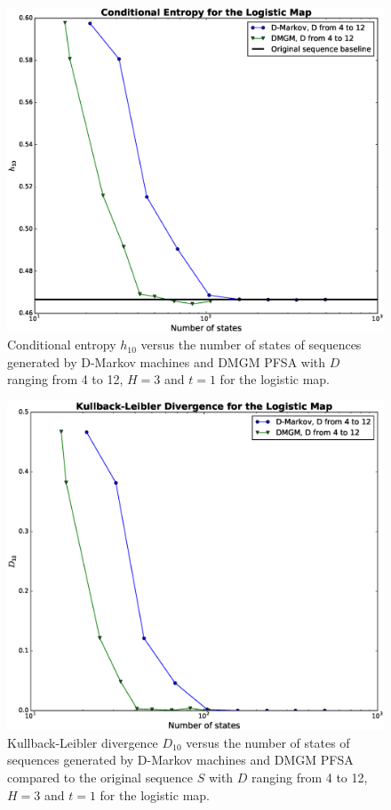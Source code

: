 {\begin{figure}[h]
\centering
\includegraphics[scale=0.35]{Figuras/logisticmap_h_mk4.eps}
\caption{Conditional entropy $h_{10}$ versus the number of states of sequences generated by D-Markov machines and DMGM PFSA with $D$ ranging from 4 to 12, $H=3$ and $t=1$ for the logistic map.\label{fig:lmapent}}
\end{figure}

\begin{figure}[h]
\centering
\includegraphics[scale=0.35]{Figuras/logisticmap_kld_mk4.eps}
\caption{Kullback-Leibler divergence $D_{10}$ versus the number of states of sequences generated by D-Markov machines and DMGM PFSA compared to the original sequence $S$ with $D$ ranging from 4 to 12, $H=3$ and $t=1$ for the logistic map.\label{fig:lmapkld}}
\end{figure}

}

